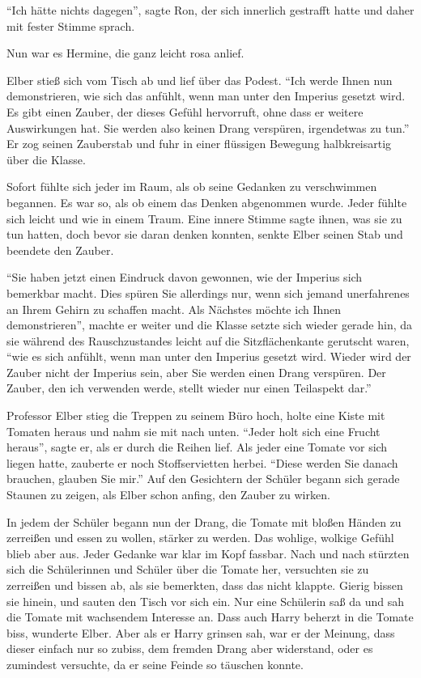 \enquote{Ich hätte nichts dagegen}, sagte Ron, der sich innerlich gestrafft hatte und daher mit fester Stimme sprach.

Nun war es Hermine, die ganz leicht rosa anlief.

Elber stieß sich vom Tisch ab und lief über das Podest. \enquote{Ich werde Ihnen nun demonstrieren, wie sich das anfühlt, wenn man unter den Imperius gesetzt wird. Es gibt einen Zauber, der dieses Gefühl hervorruft, ohne dass er weitere Auswirkungen hat. Sie werden also keinen Drang verspüren, irgendetwas zu tun.} Er zog seinen Zauberstab und fuhr in einer flüssigen Bewegung halbkreisartig über die Klasse.

Sofort fühlte sich jeder im Raum, als ob seine Gedanken zu verschwimmen begannen. Es war so, als ob einem das Denken abgenommen wurde. Jeder fühlte sich leicht und wie in einem Traum. Eine innere Stimme sagte ihnen, was sie zu tun hatten, doch bevor sie daran denken konnten, senkte Elber seinen Stab und beendete den Zauber.

\enquote{Sie haben jetzt einen Eindruck davon gewonnen, wie der Imperius sich bemerkbar macht. Dies spüren Sie allerdings nur, wenn sich jemand unerfahrenes an Ihrem Gehirn zu schaffen macht. Als Nächstes möchte ich Ihnen demonstrieren\abs}, machte er weiter und die Klasse setzte sich wieder gerade hin, da sie während des Rauschzustandes leicht auf die Sitzflächenkante gerutscht waren, \enquote{\aabs wie es sich anfühlt, wenn man unter den Imperius gesetzt wird. Wieder wird der Zauber nicht der Imperius sein, aber Sie werden einen Drang verspüren. Der Zauber, den ich verwenden werde, stellt wieder nur einen Teilaspekt dar.}

Professor Elber stieg die Treppen zu seinem Büro hoch, holte eine Kiste mit Tomaten heraus und nahm sie mit nach unten. \enquote{Jeder holt sich eine Frucht heraus}, sagte er, als er durch die Reihen lief. Als jeder eine Tomate vor sich liegen hatte, zauberte er noch Stoffservietten herbei. \enquote{Diese werden Sie danach brauchen, glauben Sie mir.} Auf den Gesichtern der Schüler begann sich gerade Staunen zu zeigen, als Elber schon anfing, den Zauber zu wirken.

In jedem der Schüler begann nun der Drang, die Tomate mit bloßen Händen zu zerreißen und essen zu wollen, stärker zu werden. Das wohlige, wolkige Gefühl blieb aber aus. Jeder Gedanke war klar im Kopf fassbar. Nach und nach stürzten sich die Schülerinnen und Schüler über die Tomate her, versuchten sie zu zerreißen und bissen ab, als sie bemerkten, dass das nicht klappte. Gierig bissen sie hinein, und sauten den Tisch vor sich ein. Nur eine Schülerin saß da und sah die Tomate mit wachsendem Interesse an. Dass auch Harry beherzt in die Tomate biss, wunderte Elber. Aber als er Harry grinsen sah, war er der Meinung, dass dieser einfach nur so zubiss, dem fremden Drang aber widerstand, oder es zumindest versuchte, da er seine Feinde so täuschen konnte.

